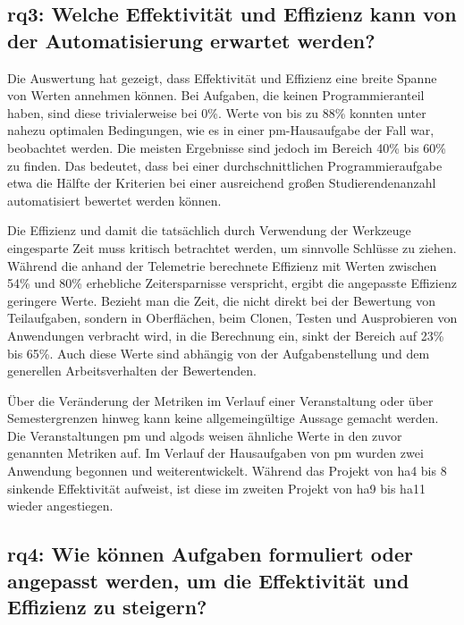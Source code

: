\subsection[\acs{rq}3]{\ac{rq}3: Welche Effektivität und Effizienz kann von der Automatisierung erwartet werden?}\label{subsec:ra3-effectivity-efficiency}

Die Auswertung hat gezeigt, dass Effektivität und Effizienz eine breite Spanne von Werten annehmen können.
Bei Aufgaben, die keinen Programmieranteil haben, sind diese trivialerweise bei 0\%.
Werte von bis zu 88\% konnten unter nahezu optimalen Bedingungen, wie es in einer \ac{pm}-Hausaufgabe der Fall war, beobachtet werden.
Die meisten Ergebnisse sind jedoch im Bereich 40\% bis 60\% zu finden.
Das bedeutet, dass bei einer durchschnittlichen Programmieraufgabe etwa die Hälfte der Kriterien bei einer ausreichend großen Studierendenanzahl automatisiert bewertet werden können.

Die Effizienz und damit die tatsächlich durch Verwendung der Werkzeuge eingesparte Zeit muss kritisch betrachtet werden, um sinnvolle Schlüsse zu ziehen.
Während die anhand der Telemetrie berechnete Effizienz mit Werten zwischen 54\% und 80\% erhebliche Zeitersparnisse verspricht, ergibt die angepasste Effizienz geringere Werte.
Bezieht man die Zeit, die nicht direkt bei der Bewertung von Teilaufgaben, sondern in Oberflächen, beim Clonen, Testen und Ausprobieren von Anwendungen verbracht wird, in die Berechnung ein, sinkt der Bereich auf 23\% bis 65\%.
Auch diese Werte sind abhängig von der Aufgabenstellung und dem generellen Arbeitsverhalten der Bewertenden.

Über die Veränderung der Metriken im Verlauf einer Veranstaltung oder über Semestergrenzen hinweg kann keine allgemeingültige Aussage gemacht werden.
Die Veranstaltungen \ac{pm} und \ac{algods} weisen ähnliche Werte in den zuvor genannten Metriken auf.
Im Verlauf der Hausaufgaben von \ac{pm} wurden zwei Anwendung begonnen und weiterentwickelt.
Während das Projekt von \ac{ha}4 bis 8 sinkende Effektivität aufweist, ist diese im zweiten Projekt von \ac{ha}9 bis \ac{ha}11 wieder angestiegen.

\subsection[\acs{rq}4]{\ac{rq}4: Wie können Aufgaben formuliert oder angepasst werden, um die Effektivität und Effizienz zu steigern?}\label{subsec:ra4-improve-effectivity-efficiency}

